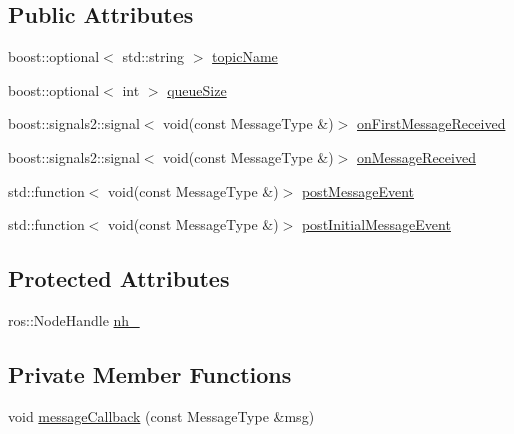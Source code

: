 \subsection*{Public Attributes}
\begin{DoxyCompactItemize}
\item 
boost\+::optional$<$ std\+::string $>$ \hyperlink{classsmacc_1_1SmaccSubscriberClient_ac062907e834aa8e4ca7964fe2035edf7}{topic\+Name}
\item 
boost\+::optional$<$ int $>$ \hyperlink{classsmacc_1_1SmaccSubscriberClient_ac8d4905509ecacb7c93d72c9acb9b6a1}{queue\+Size}
\item 
boost\+::signals2\+::signal$<$ void(const Message\+Type \&)$>$ \hyperlink{classsmacc_1_1SmaccSubscriberClient_a2927ee2e390f12000379c9f48ddb7695}{on\+First\+Message\+Received}
\item 
boost\+::signals2\+::signal$<$ void(const Message\+Type \&)$>$ \hyperlink{classsmacc_1_1SmaccSubscriberClient_a7635fbb013c6fdbc3998da11b44766bb}{on\+Message\+Received}
\item 
std\+::function$<$ void(const Message\+Type \&)$>$ \hyperlink{classsmacc_1_1SmaccSubscriberClient_ac131b24d58ff06791068f8dfd3401a0b}{post\+Message\+Event}
\item 
std\+::function$<$ void(const Message\+Type \&)$>$ \hyperlink{classsmacc_1_1SmaccSubscriberClient_aeec34b082c687a24a89942aca44575cc}{post\+Initial\+Message\+Event}
\end{DoxyCompactItemize}
\subsection*{Protected Attributes}
\begin{DoxyCompactItemize}
\item 
ros\+::\+Node\+Handle \hyperlink{classsmacc_1_1SmaccSubscriberClient_addb62aabc4f81ddac5a151642335ab54}{nh\+\_\+}
\end{DoxyCompactItemize}
\subsection*{Private Member Functions}
\begin{DoxyCompactItemize}
\item 
void \hyperlink{classsmacc_1_1SmaccSubscriberClient_a4102c06930ea8c7ab3d8c5ed9621ce4e}{message\+Callback} (const Message\+Type \&msg)
\end{DoxyCompactItemize}
